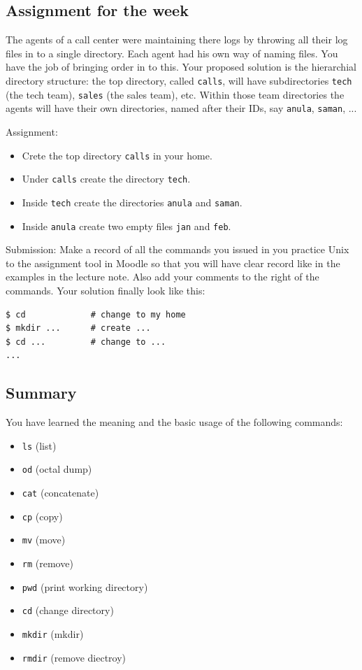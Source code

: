 \documentclass[11pt,a4paper,twoside]{article}
\begin{document}
\subsection{Assignment for the week}
The agents of a call center were maintaining there logs by throwing all
their log files in to a single directory. Each agent had his own way of
naming files. You have the job of bringing order in to this. Your proposed
solution is the hierarchial directory structure: the top directory, 
called \texttt{calls}, will have subdirectories \texttt{tech} (the tech
team), \texttt{sales} (the sales team), etc. Within those team directories
the agents will have their own directories, named after their IDs, 
say \texttt{anula}, \texttt{saman}, ...

Assignment: 
\begin{itemize}
\item Crete the top directory \texttt{calls} in your home.

\item Under \texttt{calls} create the directory \texttt{tech}.

\item Inside \texttt{tech} create the directories \texttt{anula} and
\texttt{saman}.

\item Inside \texttt{anula} create two empty files \texttt{jan} and \texttt{feb}.
\end{itemize}

Submission:
Make a record of all the commands you issued in you practice Unix to the 
assignment tool in Moodle so that you will have clear record like in the 
examples in the lecture note. Also add your comments to the right of the
commands. Your solution finally look like this:

\begin{lstlisting}[frame=single]
$ cd             # change to my home
$ mkdir ...      # create ...
$ cd ...         # change to ...
...   
\end{lstlisting}


\subsection*{Summary}
You have learned the meaning and the basic usage of the following commands:

\begin{itemize}
\item \texttt{ls} (list)
\item \texttt{od} (octal dump)
\item \texttt{cat} (concatenate)
\item \texttt{cp} (copy)
\item \texttt{mv} (move)
\item \texttt{rm} (remove)
\item \texttt{pwd} (print working directory)
\item \texttt{cd} (change directory)
\item \texttt{mkdir} (mkdir)
\item \texttt{rmdir} (remove diectroy)
\end{itemize}
\end{document}
